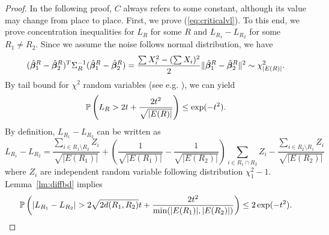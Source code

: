 \begin{proof}
In the following proof, $C$ always refers to some constant, although its value may change from place to place. First, we prove (\ref{eq:criticalvl}). To this end, we prove concentration inequalities for $L_R$ for some $R$ and $L_{R_1}-L_{R_2}$ for some $R_1\ne R_2$.
Since we assume the noise follows normal distribution, we have 
$$
(\hat{\bm{\beta}}_1^R-\hat{\bm{\beta}}_2^R)^T\Sigma_R^{-1}(\hat{\bm{\beta}}_1^R-\hat{\bm{\beta}}_2^R)=\frac{\sum X_i^2-(\sum X_i)^2}{ 2}\|\hat{\bm{\beta}}_1^R-\hat{\bm{\beta}}_2^R\|^2\sim \chi^2_{|E(R)|}.
$$
By tail bound for $\chi^2$ random variables (see e.g. \cite{laurent2000adaptive}), we can yield
\begin{equation}
\label{eq:single}
\mathbb{P}\left(L_R>2t+\frac{2t^2}{\sqrt{|E(R)|}}\right)\le \exp(-t^2).
\end{equation}
By definition, $L_{R_1}-L_{R_2}$ can be written as
$$
L_{R_1}-L_{R_2}=\frac{\sum_{i\in R_1\setminus R_2}Z_i}{ \sqrt{|E(R_1)|}}+ \left(\frac{1}{\sqrt{|E(R_1)|}}-\frac{1 }{\sqrt{|E(R_2)|}}\right)\sum_{i\in R_1\cap R_2}Z_i -\frac{\sum_{i\in R_2\setminus R_1}Z_i}{\sqrt{|E(R_2)|}}
$$
where $Z_i$ are independent random variable following distribution $\chi_1^2-1$.
Lemma~\ref{lm:diffbd} implies
\begin{equation}
\label{eq:diff}
\PP\left(|L_{R_1}-L_{R_2}|>2\sqrt{2d(R_1,R_2)}t+\frac{2t^2}{\min(|E(R_1)|,|E(R_2)|)}\right)\le 2\exp(-t^2).
\end{equation}


\end{proof}
